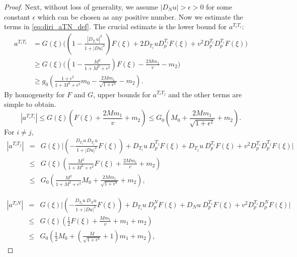\documentclass[12pt]{article}
\numberwithin{equation}{section}
\theoremstyle{plain}
\theoremstyle{definition}
\theoremstyle{remark}
\begin{document}
\begin{proof}
Next, without loss of generality, we assume $|D_N u| > \epsilon > 0$ for some constant 
$\epsilon$ which can be chosen as any positive number. Now we estimate the terms in 
\eqref{eq:diri_aTN_def}. The crucial estimate is the lower bound for $a^{T_iT_i}$:
\begin{equation}
\begin{split}
    a^{T_i T_i} & = G(\xi) \Bigg( \left( 1 - \frac{|D_{T_i} u|^2}{1+|Du|^2} \right) F(\xi) + 2 D_{T_i} u D^{T_i}_p F(\xi) + v^2 D^{T_i}_p D^{T_i}_p F(\xi) \Bigg) \\
    & \geq G(\xi) \Bigg( \left( 1 - \frac{M^2}{1 + M^2 + \epsilon^2} \right) F(\xi) - \frac{2 M m_1}{v} - m_2  \Bigg) \\
    & \geq g_0 \left(  \frac{1 + \epsilon^2}{1 + M^2 + \epsilon^2} m_0 - \frac{2 M m_1}{\sqrt{1+\epsilon^2}} - m_2 \right).
\end{split}
\label{eq:diri_aTT_low}
\end{equation}
By homogeneity for $F$ and $G$, upper bounds for $a^{T_iT_j}$ and the other terms are simple to obtain.
\begin{equation}\label{eq:diri_aTT_up}
    |a^{T_i T_i}| \leq G(\xi) \left( F(\xi) + \frac{2 M m_1}{v} + m_2  \right) \leq G_0 \left( M_0 + \frac{2 M m_1}{\sqrt{1+\epsilon^2}} + m_2 \right).
\end{equation}
For $i\neq j$, 
\begin{eqnarray*}
    |a^{T_i T_j}| & = & G(\xi) \Bigg| \left(  - \frac{D_{T_i} u \ D_{T_j} u}{1+|Du|^2} F(\xi) \right) +  D_{T_i} u \ D^{T_j}_p F(\xi) + D_{T_j} u \ D^{T_i}_p F(\xi) + v^2 D^{T_i}_p D^{T_j}_p F(\xi) \Bigg| \\
    & \leq & G(\xi) \left(  \frac{M^2}{1+M^2+\epsilon^2} F(\xi) + \frac{2 Mm_1}{v} + m_2 \right) \\
    & \leq & G_0 \left(  \frac{M^2}{1+M^2+\epsilon^2} M_0 + \frac{2 Mm_1}{\sqrt{1+\epsilon^2}} + m_2 \right),
\end{eqnarray*}

\begin{eqnarray*}
    |a^{T_i N}| &=&  G(\xi) \Bigg| \left(  - \frac{D_{T_i} u \ D_{N} u}{1+|Du|^2} F(\xi) \right) +  D_{T_i} u \ D^{N}_p F(\xi) + D_{N} u \ D^{T_i}_p F(\xi) + v^2 D^{T_i}_p D^{N}_p F(\xi) \Bigg| \\
    & \leq & G(\xi) \left( \frac{1}{2} F(\xi) + \frac{M m_1}{v} + m_1 + m_2 \right) \\
    & \leq & G_0 \left( \frac{1}{2} M_0 + (\frac{M}{\sqrt{1+\epsilon^2}} + 1) m_1 + m_2 \right),
\end{eqnarray*}


\end{proof}
\end{document}
